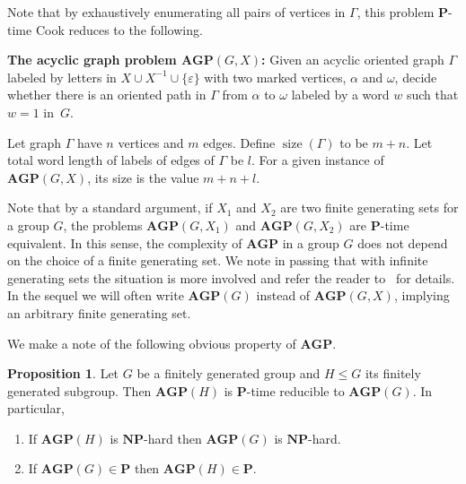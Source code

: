\documentclass[10pt]{amsart}
\theoremstyle{definition}
\newtheorem{proposition}[theorem]{Proposition}
\DeclareMathOperator{\size}{{size}}
\def\P{{\mathbf{P}}}
\def\NP{{\mathbf{NP}}}
\def\AGP{{\mathbf{AGP}}}
\begin{document}
\medskip
Note that by exhaustively enumerating all pairs of vertices in $\Gamma$, this problem $\P$-time Cook reduces to the following.

\medskip
\noindent
{\bf The acyclic graph problem $\AGP(G,X)$\index{$\AGP(G,X)$}:}
Given an acyclic oriented graph $\Gamma$ labeled by letters in $X\cup X^{-1}\cup \{\varepsilon\}$ with two marked vertices, $\alpha$ and $\omega$, decide whether there is an oriented path in $\Gamma$ from $\alpha$ to $\omega$ labeled by a word $w$ such that $w=1$ in~$G$.

\medskip
Let graph $\Gamma$ have $n$ vertices and $m$ edges. Define $\size(\Gamma)$ to be $m+n$. Let total word length of labels of edges of $\Gamma$ be $l$. For a given instance of $\AGP(G,X)$, its size is the value $m+n+l$.

Note that by a standard argument, if $X_1$ and $X_2$ are two finite generating sets for a group $G$, the problems $\AGP(G,X_1)$ and $\AGP(G,X_2)$ are $\P$-time equivalent. In this sense, the complexity  of $\AGP$ in a group $G$ does not depend on the choice of a finite generating set. We note in passing that with infinite generating sets the situation is more involved and refer the reader to~\cite{Miasnikov-Nikolaev-Ushakov:2014a} for details. In the sequel we will often write $\AGP(G)$ instead of $\AGP(G,X)$, implying an arbitrary finite generating set.

We make a note of the following obvious property of $\AGP$.
\begin{proposition}\label{pr:subgroup}
Let $G$ be a finitely generated group and $H\le G$ its finitely generated subgroup. Then $\AGP(H)$ is $\P$-time reducible to $\AGP(G)$. In particular,
\begin{enumerate}
\item If $\AGP(H)$ is $\NP$-hard then $\AGP(G)$ is $\NP$-hard.
\item If $\AGP(G)\in \P$ then $\AGP(H)\in \P$.
\end{enumerate}
\end{proposition}
\end{document}
